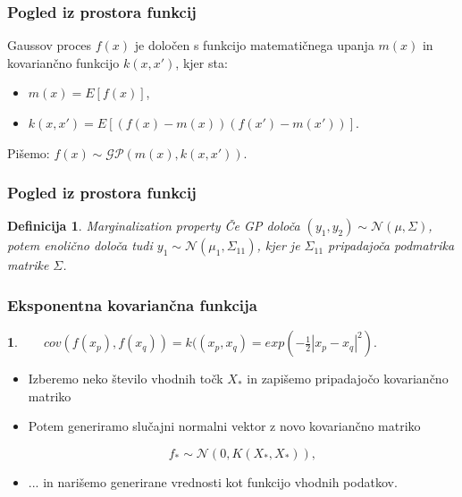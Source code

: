 \documentclass{beamer}
\newtheorem{proposition}[theorem]{Definicija}
\newtheorem{enacba}[theorem]{}
\begin{document}
\begin{frame}

\frametitle{Pogled iz prostora funkcij}

Gaussov proces $f(x)$ je določen s funkcijo matematičnega upanja $m(x)$ in kovariančno funkcijo $k(x, x')$, kjer sta:
\begin{itemize}
\item $ m(x) = E[ f(x) ] $, 
\item $ k(x, x') = E[ (f(x) - m(x)) (f(x')-m(x')) ] $.
\end{itemize}

Pišemo: $ f(x) \sim \mathcal{GP}(m(x), k(x,x'))$.
\end{frame}

\begin{frame}
\frametitle{Pogled iz prostora funkcij}

\begin{proposition}\alert{Marginalization property} { Če GP določa $ (y_{1}, y_{2})  \sim  \mathcal{N}(\mu, \Sigma) $, 
potem enolično določa tudi $y_{1} \sim  \mathcal{N}(\mu_{1}, \Sigma_{11})$, kjer je
$\Sigma_{11}$ pripadajoča podmatrika matrike $\Sigma$. }
\end{proposition}


\end{frame}

\begin{frame}
\frametitle{Eksponentna kovariančna funkcija}

\begin{enacba}
 ~ ~ $cov(f(x_{p}), f(x_{q})) = k((x_{p},x_{q}) = exp( - \frac{1}{2} |x_{p} - x_{q}|^2).$
\end{enacba}
\begin{itemize}
\item Izberemo neko število vhodnih točk $X_{*}$ in zapišemo pripadajočo kovariančno matriko 
\item Potem generiramo slučajni normalni vektor z novo kovariančno matriko

\begin{equation} 
f_{*} \sim \mathcal{N}(0, K(X_{*}, X_{*})),
\end{equation}

\item ... in narišemo generirane vrednosti kot funkcijo vhodnih podatkov. 
\end{itemize}

\end{frame}
\end{document}
